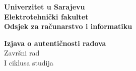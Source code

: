 
\pagebreak

\thispagestyle{plain}
\begin{flushleft}
	\textbf{Univerzitet u Sarajevu}\\
	\textbf{Elektrotehnički fakultet}\\
	\textbf{Odsjek za računarstvo i informatiku }\\
\end{flushleft}

\begin{center}
	\vspace{1cm}
	{\Large \textbf{Izjava o autentičnosti radova}}\\
	\vspace{0.3cm}
	{\Large Završni rad}\\
	\vspace{0.2cm}
	{\Large I ciklusa studija}
	\vspace{0.5cm}
\end{center}

